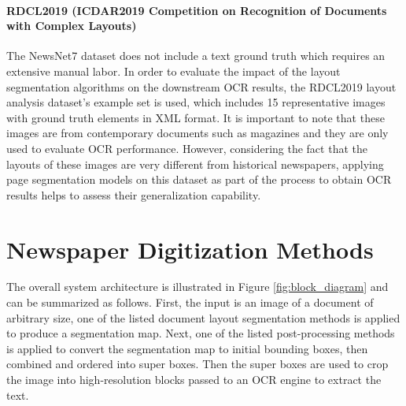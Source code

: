 \documentclass[letterpaper]{article} %
\begin{document}
\paragraph{RDCL2019 (ICDAR2019 Competition on Recognition of Documents with Complex Layouts)}
The NewsNet7 dataset does not include a text ground truth which requires an extensive manual labor. In order to evaluate the impact of the layout segmentation algorithms on the downstream OCR results, the RDCL2019 layout analysis dataset's \cite{DBLP:conf/icdar/ClausnerAP19} example set  is used, which includes 15 representative images with ground truth elements in XML format. It is important to note that these images are from contemporary documents such as magazines and they are only used to evaluate OCR performance. However, considering the fact that the layouts of these images are very different from historical newspapers, applying page segmentation models on this dataset as part of the process to obtain OCR results helps to assess their generalization capability.
 

 

\section{Newspaper Digitization Methods}
The overall system architecture is illustrated in Figure \ref{fig:block_diagram} and can be summarized as follows. First, the input is an image of a document of arbitrary size, one of the listed document layout segmentation methods is applied to produce a segmentation map. Next, one of the listed post-processing methods is applied to convert the segmentation map to initial bounding boxes, then combined and ordered into super boxes. Then the super boxes are used to crop the image into high-resolution blocks passed to an OCR engine to extract the text.

\end{document}
